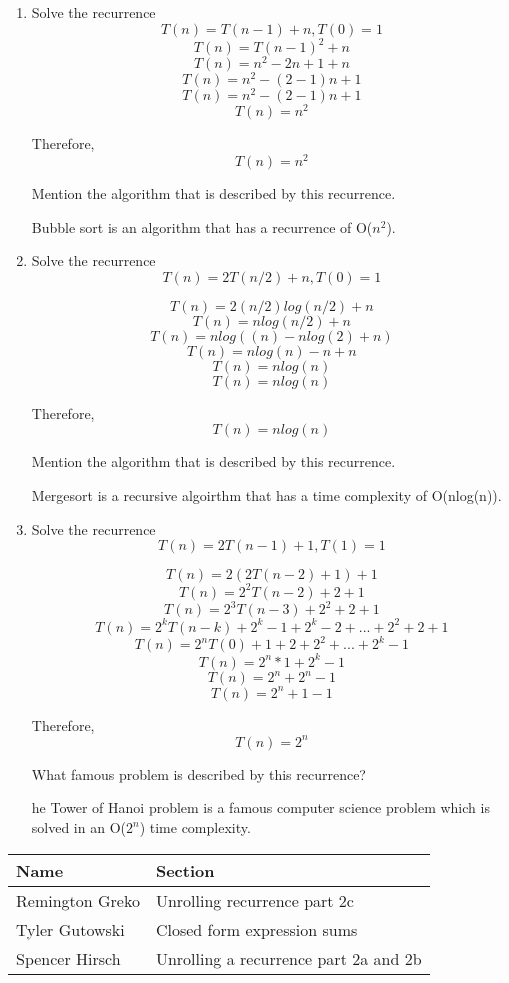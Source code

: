 \documentclass{article}
\begin{document}
\begin{enumerate}
    \item Solve the recurrence
            \[ T(n) = T(n-1) + n, T(0) = 1 \]
            \[ T(n) = T(n-1)^2 + n\]
            \[ T(n) = n^2 -2n + 1 + n\]
            \[ T(n) = n^2 - (2-1)n + 1\]
            \[ T(n) = n^2 - (2-1)n + 1\]
            \[T(n) = n^2\]

            Therefore, \[T(n) = n^2\]

            Mention the algorithm that is described by this recurrence.

            Bubble sort is an algorithm that has a recurrence of O($n^2$).
    \item Solve the recurrence
            \[ T(n) = 2T(n/2) + n, T(0) = 1\]
        
            \[ T(n) = 2(n/2)log(n/2) + n \]
            \[ T(n) = nlog(n/2) + n \]
            \[ T(n) = nlog((n) - nlog(2) + n) \]
            \[ T(n) = nlog(n) - n + n \]
            \[ T(n) = nlog(n) \]
            \[ T(n) = nlog(n) \]

            Therefore, \\
            \[T(n) = nlog(n)\]

            Mention the algorithm that is described by this recurrence.

            Mergesort is a recursive algoirthm that has a time complexity of O(nlog(n)).
    \item Solve the recurrence
            \[ T(n) = 2T(n-1) + 1, T(1) = 1 \]

            \[ T(n) = 2(2T(n-2) + 1) + 1 \]
            \[ T(n) = 2^2T(n-2) + 2 + 1 \]
            \[ T(n) = 2^3T(n-3) + 2^2 + 2 + 1 \]
            \[ T(n) = 2^kT(n-k) + 2^k-1 + 2^k-2 + ... + 2^2 + 2 + 1 \]
            \[ T(n) = 2^nT(0) + 1 + 2 + 2^2 + ... + 2^k-1 \]
            \[ T(n) = 2^n * 1 + 2^k - 1 \]
            \[ T(n) = 2^n + 2^n - 1 \]
            \[ T(n) = 2^n+1 - 1 \]
            
            Therefore, \\
            \[ T(n) = 2^n \]
            
            What famous problem is described by this recurrence?

            he Tower of Hanoi problem is a famous computer science problem which is 
            solved in an O($2^n$) time complexity.

\end{enumerate}


\pagebreak

\begin{center}
        \begin{tabular}{|p{3cm}|p{6cm}|}
            \hline
            \textbf{Name} & \textbf{Section} \\
            \hline
            Remington Greko & Unrolling recurrence part 2c\\
            \hline
            Tyler Gutowski & Closed form expression sums\\
            \hline
            Spencer Hirsch & Unrolling a recurrence part 2a and 2b \\
            \hline
        \end{tabular}
    \end{center}
\end{document}
